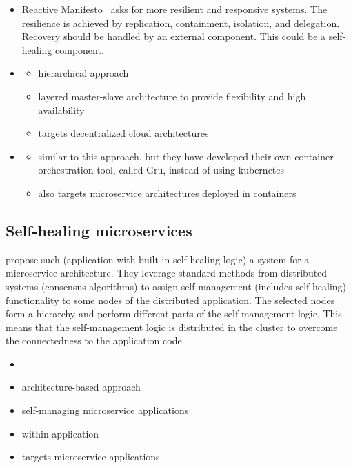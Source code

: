   \begin{itemize}
    \item Reactive Manifesto~\cite{reactivemanifesto} asks for more resilient and responsive systems.
    The resilience is achieved by replication, containment, isolation, and delegation.
    Recovery should be handled by an external component.
    This could be a self-healing component.
    \item \cite{StackCloud}
      \begin{itemize}
        \item hierarchical approach
        \item layered master-slave architecture to provide flexibility and high availability
        \item targets decentralized cloud architectures
      \end{itemize}
    \item \cite{gru}
      \begin{itemize}
      \item similar to this approach, but they have developed their own container orchestration tool, called Gru, instead of using \gls{kubernetes}
      \item also targets microservice architectures deployed in containers
    \end{itemize}
  \end{itemize}

\subsection{Self-healing microservices}
  \citeauthor{ToffettiMicroservices} propose such (application with built-in self-healing logic) a system for a microservice architecture.
  They leverage standard methods from distributed systems (\ie consensus algorithms) to assign self-management (includes self-healing) functionality to some nodes of the distributed application.
  The selected nodes form a hierarchy and perform different parts of the self-management logic.
  This means that the self-management logic is distributed in the cluster to overcome the connectedness to the application code.

  \begin{itemize}
    \item \cite{ToffettiMicroservices}
    \item architecture-based approach
    \item self-managing microservice applications
    \item within application
    \item targets microservice applications
  \end{itemize}

